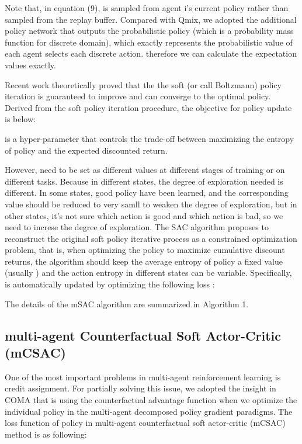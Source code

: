 \documentclass[runningheads]{llncs}
\begin{document}
Note that, in equation (9),  is sampled from agent i's current policy  rather than sampled from the replay buffer. Compared with Qmix, we adopted the additional policy network that outputs the probabilistic policy (which is a probability mass function for discrete domain), which exactly represents the probabilistic value of each agent selects each discrete action. therefore we can calculate the expectation values exactly.



Recent work theoretically proved that the the soft (or call Boltzmann) policy iteration is guaranteed to improve and can converge to the optimal policy. Derived from the soft policy iteration procedure, the objective for policy update is below: 

 is a hyper-parameter that controls the trade-off between maximizing the entropy of policy and the expected discounted return. 


However,  need to be set as different values  at different stages of training or on different tasks. Because in different states, the degree of exploration needed is different. In some states, good policy have been learned, and the corresponding  value should be reduced to very samll to weaken the degree of exploration, but in other states, it's not sure which action is good and which action is bad, so we need to increse the degree of exploration. The SAC algorithm proposes to reconstruct the original soft policy iterative process as a constrained optimization problem, that is, when optimizing the policy to maximize cumulative discount returns, the algorithm should keep the average entropy of policy a fixed value (usually ) and the action entropy in different states can be variable.  Specifically,  is automatically updated by optimizing the following loss \cite{b11}:


The details of the mSAC algorithm are summarized in Algorithm 1.


\subsection{multi-agent Counterfactual Soft Actor-Critic (mCSAC)}
One of the most important problems in multi-agent reinforcement learning is credit assignment. For partially solving this issue, we adopted the insight in COMA that is using the counterfactual advantage function when we optimize the individual policy in the multi-agent decomposed policy gradient paradigms. The loss function of policy in multi-agent  counterfactual soft actor-critic (mCSAC) method is as following:
\end{document}
